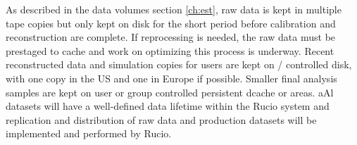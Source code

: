 \documentclass[../main-v1.tex]{subfiles}
\begin{document}
As described in the data volumes section \ref{ch:est}, raw data is kept in multiple tape copies but only kept on disk for the short period before calibration and reconstruction are complete.  If reprocessing is needed, the raw data must be prestaged to cache and work on optimizing this process is underway. Recent reconstructed data and simulation copies for users are kept on / controlled disk, with one copy in the US and one in Europe if possible. Smaller final analysis samples are kept on user or group controlled persistent dcache or  areas. aAl datasets will have a well-defined data lifetime within the Rucio system and replication and distribution of raw data and production datasets will be implemented and performed by Rucio.

\end{document}
